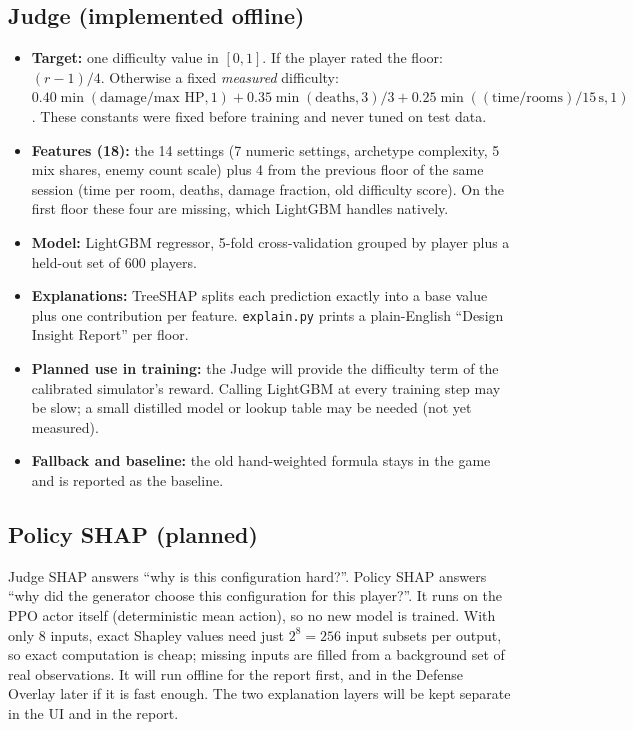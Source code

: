 \subsection{Judge (implemented offline)}
\label{sec:judge}
\begin{itemize}
    \item \textbf{Target:} one difficulty value in $[0,1]$. If the player rated the floor: $(r - 1)/4$. Otherwise a fixed \emph{measured} difficulty: $0.40 \min(\text{damage}/\text{max HP}, 1) + 0.35 \min(\text{deaths}, 3)/3 + 0.25 \min((\text{time}/\text{rooms})/15\,\text{s}, 1)$. These constants were fixed before training and never tuned on test data.
    \item \textbf{Features (18):} the 14 settings (7 numeric settings, archetype complexity, 5 mix shares, enemy count scale) plus 4 from the previous floor of the same session (time per room, deaths, damage fraction, old difficulty score). On the first floor these four are missing, which LightGBM handles natively.
    \item \textbf{Model:} LightGBM regressor, 5-fold cross-validation grouped by player plus a held-out set of 600 players.
    \item \textbf{Explanations:} TreeSHAP splits each prediction exactly into a base value plus one contribution per feature. \texttt{explain.py} prints a plain-English ``Design Insight Report'' per floor.
    \item \textbf{Planned use in training:} the Judge will provide the difficulty term of the calibrated simulator's reward. Calling LightGBM at every training step may be slow; a small distilled model or lookup table may be needed (not yet measured).
    \item \textbf{Fallback and baseline:} the old hand-weighted formula stays in the game and is reported as the baseline.
\end{itemize}

\subsection{Policy SHAP (planned)}
Judge SHAP answers ``why is this configuration hard?''. Policy SHAP answers ``why did the generator choose this configuration for this player?''. It runs on the PPO actor itself (deterministic mean action), so no new model is trained. With only 8 inputs, exact Shapley values need just $2^8 = 256$ input subsets per output, so exact computation is cheap; missing inputs are filled from a background set of real observations. It will run offline for the report first, and in the Defense Overlay later if it is fast enough. The two explanation layers will be kept separate in the UI and in the report.

